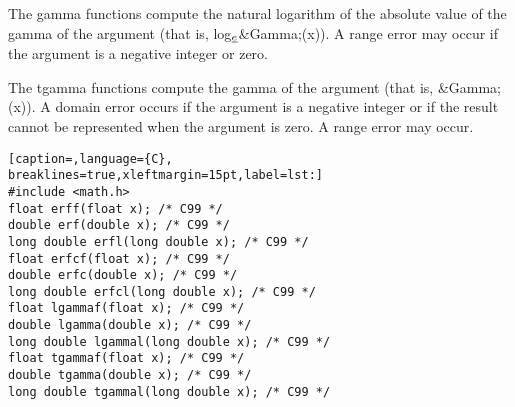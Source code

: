 The gamma functions compute the natural logarithm of the absolute value of the
gamma of the argument (that is,
log\(_{\emph{e}}\)\textbar{}\&Gamma;(x)\textbar{}). A range error may occur if
the argument is a negative integer or zero.

The tgamma functions compute the gamma of the argument (that is, \&Gamma;(x)).
A domain error occurs if the argument is a negative integer or if the result
cannot be represented when the argument is zero. A range error may occur.
\lstset{basicstyle=\scriptsize, numbers=left, captionpos=b, tabsize=4}
\begin{lstlisting}[caption=,language={C},
breaklines=true,xleftmargin=15pt,label=lst:]
#include <math.h>
float erff(float x); /* C99 */
double erf(double x); /* C99 */
long double erfl(long double x); /* C99 */
float erfcf(float x); /* C99 */
double erfc(double x); /* C99 */
long double erfcl(long double x); /* C99 */
float lgammaf(float x); /* C99 */
double lgamma(double x); /* C99 */
long double lgammal(long double x); /* C99 */
float tgammaf(float x); /* C99 */
double tgamma(double x); /* C99 */
long double tgammal(long double x); /* C99 */
\end{lstlisting}
